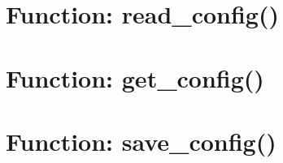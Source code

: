 \documentclass{report} \usepackage{titlesec}
\begin{document}





\section{Function: read\_config()}%


\section{Function: get\_config()}%


\section{Function: save\_config()}%



\newpage
\printbibliography
\end{document}

